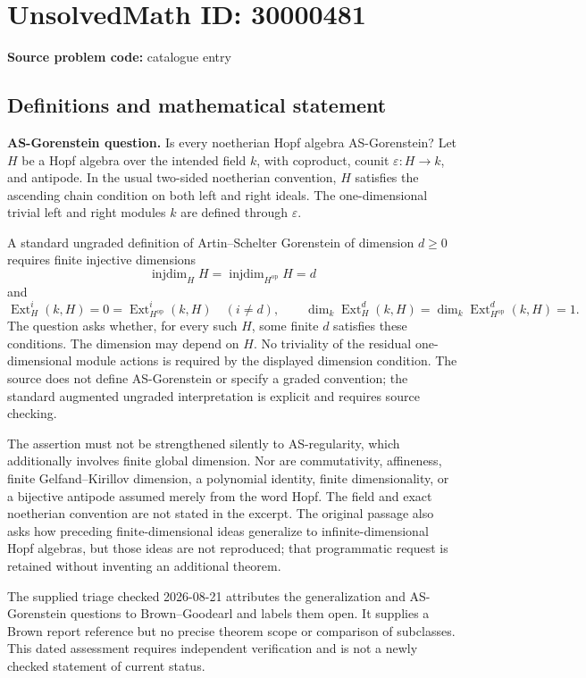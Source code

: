\documentclass[11pt]{article}
\begin{document}
\section*{UnsolvedMath ID: 30000481}
\textbf{Source problem code:} catalogue entry
\subsection{Definitions and mathematical statement}
\textbf{AS-Gorenstein question.} Is every noetherian Hopf algebra AS-Gorenstein? Let \(H\) be a Hopf algebra over the intended field \(k\), with coproduct, counit \(\varepsilon:H\to k\), and antipode. In the usual two-sided noetherian convention, \(H\) satisfies the ascending chain condition on both left and right ideals. The one-dimensional trivial left and right modules \(k\) are defined through \(\varepsilon\).\par A standard ungraded definition of Artin--Schelter Gorenstein of dimension \(d\ge0\) requires finite injective dimensions\[\operatorname{injdim}_H H=\operatorname{injdim}_{H^{\mathrm{op}}}H=d\] and\[\operatorname{Ext}_H^i(k,H)=0=\operatorname{Ext}_{H^{\mathrm{op}}}^i(k,H)\quad(i\ne d),\qquad \dim_k\operatorname{Ext}_H^d(k,H)=\dim_k\operatorname{Ext}_{H^{\mathrm{op}}}^d(k,H)=1.\] The question asks whether, for every such \(H\), some finite \(d\) satisfies these conditions. The dimension may depend on \(H\). No triviality of the residual one-dimensional module actions is required by the displayed dimension condition. The source does not define AS-Gorenstein or specify a graded convention; the standard augmented ungraded interpretation is explicit and requires source checking.\par The assertion must not be strengthened silently to AS-regularity, which additionally involves finite global dimension. Nor are commutativity, affineness, finite Gelfand--Kirillov dimension, a polynomial identity, finite dimensionality, or a bijective antipode assumed merely from the word Hopf. The field and exact noetherian convention are not stated in the excerpt. The original passage also asks how preceding finite-dimensional ideas generalize to infinite-dimensional Hopf algebras, but those ideas are not reproduced; that programmatic request is retained without inventing an additional theorem.\par The supplied triage checked 2026-08-21 attributes the generalization and AS-Gorenstein questions to Brown--Goodearl and labels them open. It supplies a Brown report reference but no precise theorem scope or comparison of subclasses. This dated assessment requires independent verification and is not a newly checked statement of current status.
\end{document}
